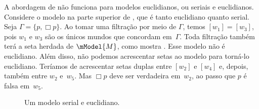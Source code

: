 \documentclass[../../../include/open-logic-section]{subfiles}
\begin{document}


A abordagem de  não funciona para modelos euclidianos,
ou seriais e euclidianos. Considere o modelo na parte superior de
, que é tanto euclidiano quanto serial. Seja
$\Gamma = \{p, \Box p \}$. Ao tomar uma filtração por meio de $\Gamma$,
temos $[w_1] = [w_3]$, pois $w_1$ e $w_3$ são os únicos mundos que
concordam em~$\Gamma$. Toda filtração também terá a seta herdada de
$\mModel{M}$, como mostra . Esse modelo não é
euclidiano. Além disso, não podemos acrescentar setas ao modelo para
torná-lo euclidiano. Teríamos de acrescentar setas duplas entre $[w_2]$
e $[w_4]$ e, depois, também entre $w_2$ e~$w_5$. Mas $\Box p$ deve ser
verdadeira em~$w_2$, ao passo que $p$ é falsa em~$w_5$.

\begin{figure}[htpb]
  \centering
  \caption{Um modelo serial e euclidiano.}
\end{figure}
\end{document}

